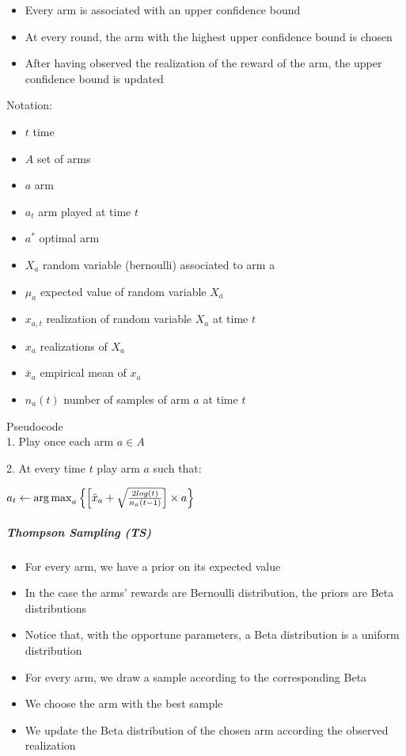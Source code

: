\begin{itemize}
	\item Every arm is associated with an upper confidence bound 
	\item At every round, the arm with the highest upper confidence bound is chosen
	\item After having observed the realization of the reward of the arm, the upper confidence bound is updated
\end{itemize}
Notation:\\
\begin{itemize}
\item $t$ time
\item $A$ set of arms
\item $a$ arm
\item $a_{t}$ arm played at time $t$
\item $a^*$ optimal arm
\item $X_{a}$ random variable (bernoulli) associated to arm a
\item $\mu_{a}$ expected value of random variable $X_{a}$
\item $x_{a,t}$ realization of random variable $X_{a}$ at time $t$
\item $x_{a}$ realizations of $X_{a}$
\item $\bar{x}_{a}$ empirical mean of $x_{a}$
\item $n_{a}(t)$ number of samples of arm $a$ at time $t$
\end{itemize}

Pseudocode\\

1. Play once each arm $a \in A$

2. At every time $t$ play arm $a$ such that:

\hspace{2em}$a_{t} \leftarrow \operatorname{arg\,max}_a{\left\{\left[\bar{x}_{a} + \sqrt{\frac{2 log(t)}{{n_{a}(t-1)}} }\right]\times a\right\}}$

\subparagraph*{Thompson Sampling (TS)}

\begin{itemize}
	\item For every arm, we have a prior on its expected value 
	\item In the case the arms’ rewards are Bernoulli distribution, the priors are Beta distributions
	\item Notice that, with the opportune parameters, a Beta distribution is a uniform distribution 
	\item For every arm, we draw a sample according to the corresponding Beta
	\item We choose the arm with the best sample 
	\item We update the Beta distribution of the chosen arm according the observed realization
\end{itemize}

